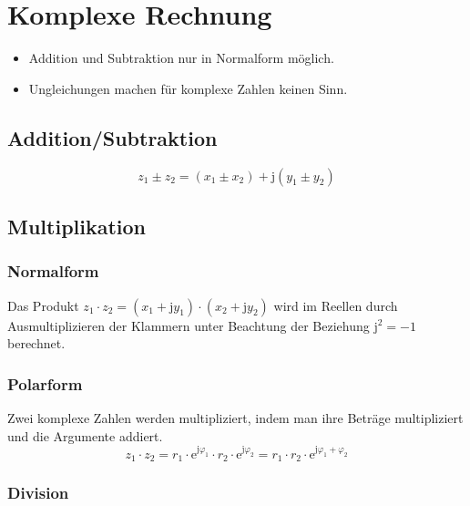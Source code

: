 \section{Komplexe Rechnung}
\begin{itemize}\itemsep0em
	\item Addition und Subtraktion nur in Normalform möglich.
	\item Ungleichungen machen für komplexe Zahlen keinen Sinn.
\end{itemize}

\subsection{Addition/Subtraktion}
\begin{equation*}
	z_1 \pm z_2 = (x_1 \pm x_2) + \mathrm j (y_1 \pm y_2)
\end{equation*}

\subsection{Multiplikation}
\subsubsection{Normalform}
Das Produkt $z_1 \cdot z_2 = (x_1 + \mathrm j y_1) \cdot (x_2 + \mathrm j y_2)$ 
wird im Reellen durch Ausmultiplizieren der Klammern unter Beachtung der Beziehung $\mathrm j^2 = -1$ berechnet.
\subsubsection{Polarform}
Zwei komplexe Zahlen werden multipliziert, indem man ihre Beträge multipliziert und die Argumente addiert.
\begin{equation*}
	z_1 \cdot z_2 = r_1 \cdot \mathrm e^{\mathrm j \varphi_1} \cdot r_2 \cdot \mathrm e^{\mathrm j \varphi_2} = r_1 \cdot r_2 \cdot \mathrm e^{\mathrm j \varphi_1 + \varphi_2}
\end{equation*}

\subsubsection{Division}
